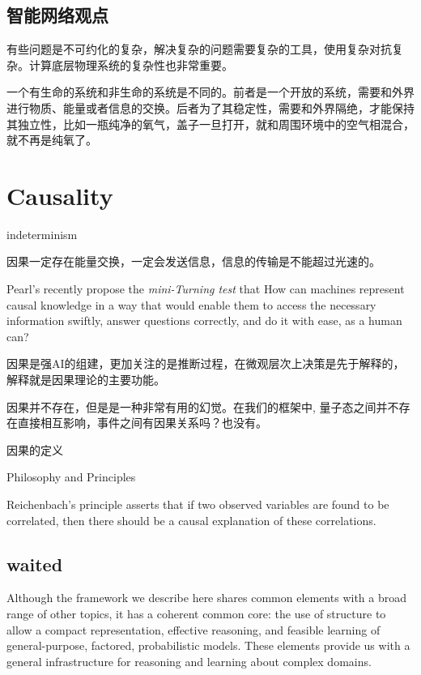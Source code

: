 \documentclass{article}
\theoremstyle{definition}
\theoremstyle{remark}
\theoremstyle{definition}
\begin{document}
\begin{CJK*}{UTF8}{gbsn}
\subsection{智能网络观点}

有些问题是不可约化的复杂，解决复杂的问题需要复杂的工具，使用复杂对抗复杂。计算底层物理系统的复杂性也非常重要。

一个有生命的系统和非生命的系统是不同的。前者是一个开放的系统，需要和外界进行物质、能量或者信息的交换。后者为了其稳定性，需要和外界隔绝，才能保持其独立性，比如一瓶纯净的氧气，盖子一旦打开，就和周围环境中的空气相混合，就不再是纯氧了。

\section{Causality}

indeterminism


因果一定存在能量交换，一定会发送信息，信息的传输是不能超过光速的。


Pearl's recently propose the \emph{mini-Turning test} that  How can machines represent causal knowledge in a way that would enable them to access the necessary information swiftly, answer questions correctly, and do it with ease, as a human can? 

因果是强AI的组建，更加关注的是推断过程，在微观层次上决策是先于解释的，解释就是因果理论的主要功能。


因果并不存在，但是是一种非常有用的幻觉。在我们的框架中, 量子态之间并不存在直接相互影响，事件之间有因果关系吗？也没有。

因果的定义

{Philosophy and Principles}

Reichenbach's principle asserts that if two observed variables are found to be correlated, then there should be a causal explanation of these correlations. 



\subsection{waited}

Although the framework we describe here shares common elements with a broad range of other topics, it has a coherent common core: the use of structure to allow a compact representation, effective reasoning, and feasible learning of general-purpose, factored, probabilistic models. These elements provide us with a general infrastructure for reasoning and learning about complex domains.



\end{CJK*}
\end{document}
